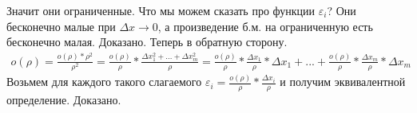 Значит они ограниченные. Что мы можем сказать про функции $\varepsilon_i$? Они бесконечно малые при $\Delta x \rightarrow 0$, а произведение б.м. на ограниченную есть бесконечно малая. Доказано. Теперь в обратную сторону.
\\
\begin{gather*}
    o(\rho) = \frac{o(\rho) * \rho^2}{\rho^2} = \frac{o(\rho)}{\rho} * \frac{\Delta x_1^2 + ... + \Delta x_m^2}{\rho} = \frac{o(\rho)}{\rho} * \frac{\Delta x_1}{\rho} * \Delta x_1 + ... + \frac{o(\rho)}{\rho} * \frac{\Delta x_m}{\rho} * \Delta x_m
\end{gather*}
Возьмем для каждого такого слагаемого $\varepsilon_i = \frac{o(\rho)}{\rho} * \frac{\Delta x_i}{\rho}$ и получим эквивалентной определение. Доказано.
